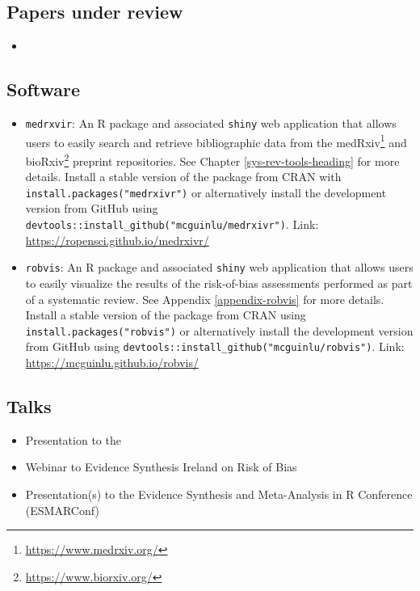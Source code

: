 \documentclass[a4paper, twoside]{templates/ociamthesis}
\providecommand{\tightlist}{%
  \setlength{\itemsep}{0pt}\setlength{\parskip}{0pt}}
\begin{document}
\hypertarget{papers-under-review}{%
\subsection{Papers under review}\label{papers-under-review}}

\begin{itemize}
\item
\end{itemize}

\hypertarget{software}{%
\subsection{Software}\label{software}}

\begin{itemize}
\item
  \texttt{medrxvir}: An R package and associated \texttt{shiny} web application that allows users to easily search and retrieve bibliographic data from the medRxiv\footnote{\url{https://www.medrxiv.org/}} and bioRxiv\footnote{\url{https://www.biorxiv.org/}} preprint repositories. See Chapter \ref{sys-rev-tools-heading} for more details. Install a stable version of the package from CRAN with \texttt{install.packages("medrxivr")} or alternatively install the development version from GitHub using \texttt{devtools::install\_github("mcguinlu/medrxivr")}. Link: \url{https://ropensci.github.io/medrxivr/}
\item
  \texttt{robvis}: An R package and associated \texttt{shiny} web application that allows users to easily visualize the results of the risk-of-bias assessments performed as part of a systematic review. See Appendix \ref{appendix-robvis} for more details. Install a stable version of the package from CRAN using \texttt{install.packages("robvis")} or alternatively install the development version from GitHub using \texttt{devtools::install\_github("mcguinlu/robvis")}. Link: \url{https://mcguinlu.github.io/robvis/}
\end{itemize}

\hypertarget{talks}{%
\subsection{Talks}\label{talks}}

\begin{itemize}
\tightlist
\item
  Presentation to the
\item
  Webinar to Evidence Synthesis Ireland on Risk of Bias
\item
  Presentation(s) to the Evidence Synthesis and Meta-Analysis in R Conference (ESMARConf)
\end{itemize}
\end{document}
